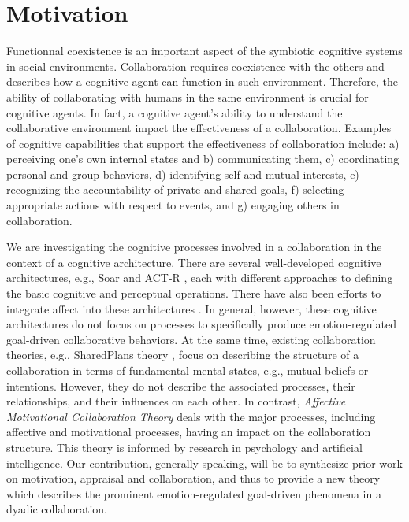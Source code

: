 \documentclass[letterpaper]{article}
\begin{document}
\section{Motivation}

Functionnal coexistence is an important aspect of the symbiotic cognitive
systems in social environments. Collaboration requires coexistence with
the others and describes how a cognitive agent can function in such environment.
Therefore, the ability of collaborating with humans in the same environment is
crucial for cognitive agents. In fact, a cognitive agent's ability to understand
the collaborative environment impact the effectiveness of a collaboration.
Examples of cognitive capabilities that support the effectiveness of
collaboration include: a) perceiving one's own internal states and b)
communicating them, c) coordinating personal and group behaviors, d) identifying
self and mutual interests, e) recognizing the accountability of private and
shared goals, f) selecting appropriate actions with respect to events, and g)
engaging others in collaboration.

We are investigating the cognitive processes involved in a collaboration in the
context of a cognitive architecture. There are several well-developed cognitive
architectures, e.g., Soar \cite{laird:soar} and ACT-R \cite{anderson:act-r},
each with different approaches to defining the basic cognitive and perceptual
operations. There have also been efforts to integrate affect into these
architectures \cite{dancy:actR-physiology-affect,marinier:behavior-emotion}. In
general, however, these cognitive architectures do not focus on processes to
specifically produce emotion-regulated goal-driven collaborative behaviors. At
the same time, existing collaboration theories, e.g., SharedPlans theory
\cite{grosz:plans-discourse}, focus on describing the structure of a
collaboration in terms of fundamental mental states, e.g., mutual beliefs or
intentions. However, they do not describe the associated processes, their
relationships, and their influences on each other. In contrast,
\textit{Affective Motivational Collaboration Theory} deals with the major
processes, including affective and motivational processes, having an impact on
the collaboration structure. This theory is informed by research in psychology
and artificial intelligence. Our contribution, generally speaking, will be to
synthesize prior work on motivation, appraisal and collaboration, and thus to
provide a new theory which describes the prominent emotion-regulated goal-driven
phenomena in a dyadic collaboration.
\end{document}
